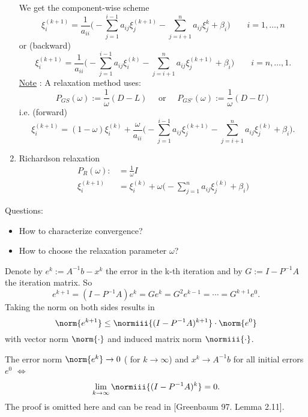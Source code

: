 \begin{enumerate}[label=\Alph{enumi})]
		We get the component-wise scheme
		\[
			\xi _{i}^{(k+1)}=\frac{1}{a_{ii}} \Big( -\sum_{j=1}^{i-1}{a_{ij}} \xi _{j}^{(k+1)}-\sum_{j=i+1}^{n}{a_{ij}\xi _{j}^{k}} + \beta _{i} \Big) \qquad i=1, \ldots, n
		\] 
		or (backward)
		\[
			\xi _{i}^{(k+1)} = \frac{1}{a_{ii}} \Big( -\sum_{j=1}^{i-1}{a_{ij}\xi _{i}^{(k)}}-\sum_{j=i+1}^{n}{a_{ij}\xi _{j}^{(k+1)}} + \beta _{i} \Big) \qquad i=n, \ldots ,1
		.\] 
		\underline{Note} : A relaxation method uses:
		\[
			P_{GS}(\omega ) := \frac{1}{\omega }(D-L) \quad \text{ or } \quad P_{GS'}(\omega ) := \frac{1}{\omega }(D-U)
		\] 
		i.e. (forward)
		\[
			\xi _{i}^{(k+1)} = (1-\omega )\xi _{i}^{(k)} + \frac{\omega }{a_{ii}} \Big( -\sum_{j=1}^{i-1}{a_{ij}\xi _{j}^{(k+1)}} - \sum_{j=i+1}^{n}{a_{ij}\xi _{j}^{(k)}} + \beta _{i} \Big) 
		.\] 
	\item Richardson relaxation
		\begin{align*}
			P_{R}(\omega ) :&= \frac{1}{\omega } I \\
			\xi _{i}^{(k+1)} &= \xi _{i}^{(k)} + \omega \Big( -\sum_{j=1}^{n}{a_{ij}\xi _{j}^{(k)}} + \beta _{i} \Big) 
		\end{align*}
\end{enumerate}
		Questions:
		\begin{itemize}
			\item How to characterize convergence?
			\item How to choose the relaxation parameter $\omega $?
		\end{itemize}

		Denote by $e^{k} := A^{-1}b - x^{k}$ the error in the k-th iteration and by $G:=I-P^{-1}A$ the iteration matrix. So
		\[
			e^{k+1}= (I-P^{-1}A)e^{k} = Ge^{k} = G^{2}e^{k-1} = \cdots = G^{k+1}e^{0}
		.\] 
		Taking the norm on both sides results in
		\[
			\norm{e^{k+1}}  \leq \normiii{(I-P^{-1}A)^{k+1}} \cdot \norm{e^{0}} 
		\] 
		with vector norm $\norm{\cdot}$ and induced matrix norm $\normiii{\cdot}$.
		\begin{lemma}
		\label{thm:richardconvergencelemma}
		The error norm $\norm{e^{k}} \rightarrow 0$ ( for $k \rightarrow \infty$) and $x^{k} \rightarrow A^{-1}b$ for all initial errors $e^{0}$ $\iff$
		\[
			\lim_{k \to \infty} \normiii{(I-P^{-1}A)^{k}} = 0
		.\] 
		The proof is omitted here and can be read in 
		[Greenbaum 97. Lemma 2.11].
		\end{lemma}

